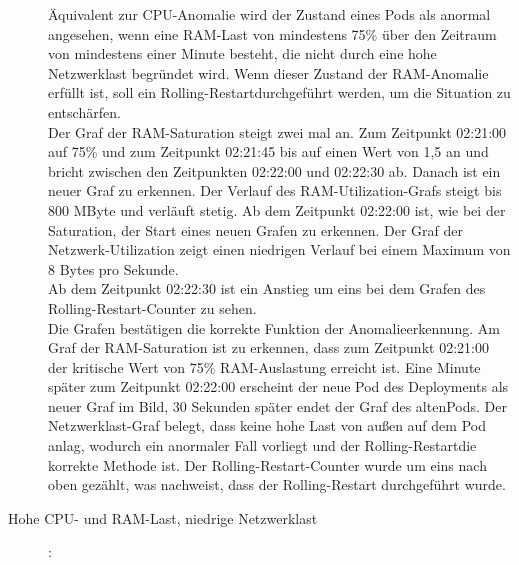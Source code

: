 \documentclass[a4paper,10pt]{scrartcl}
\begin{document}
\begin{description}
Äquivalent zur CPU-Anomalie wird der Zustand eines Pods als anormal angesehen, wenn eine RAM-Last von mindestens 75\% über den Zeitraum von mindestens einer Minute besteht, die nicht durch eine hohe Netzwerklast begründet wird. Wenn dieser Zustand  der RAM-Anomalie erfüllt ist, soll ein \glqq Rolling-Restart\grqq durchgeführt werden, um die Situation zu entschärfen.\\
Der Graf der RAM-Saturation steigt zwei mal an. Zum Zeitpunkt 02:21:00 auf 75\% und zum Zeitpunkt 02:21:45 bis auf einen Wert von 1,5 an und bricht zwischen den Zeitpunkten 02:22:00 und 02:22:30 ab. Danach ist ein neuer Graf zu erkennen.
Der Verlauf des RAM-Utilization-Grafs steigt bis 800 MByte und verläuft stetig. Ab dem Zeitpunkt 02:22:00 ist, wie bei der Saturation, der Start eines neuen Grafen zu erkennen.
Der Graf der Netzwerk-Utilization zeigt einen niedrigen Verlauf bei einem Maximum von 8 Bytes pro Sekunde.\\
Ab dem Zeitpunkt 02:22:30 ist ein Anstieg um eins bei dem Grafen des \glqq Rolling-Restart\grqq -Counter zu sehen.\\
Die Grafen bestätigen die korrekte Funktion der Anomalieerkennung. Am Graf der RAM-Saturation ist zu erkennen, dass zum Zeitpunkt 02:21:00 der kritische Wert von 75\% RAM-Auslastung erreicht ist. Eine Minute später zum Zeitpunkt 02:22:00 erscheint der neue Pod des Deployments als neuer Graf im Bild, 30 Sekunden später endet der Graf des \glqq alten\grqq Pods. Der Netzwerklast-Graf belegt, dass keine hohe Last von außen auf dem Pod anlag, wodurch ein anormaler Fall vorliegt und der \glqq Rolling-Restart\grqq die korrekte Methode ist.
Der \glqq Rolling-Restart\grqq -Counter wurde um eins nach oben gezählt, was nachweist, dass der Rolling-Restart durchgeführt wurde. 
\pagebreak

\item[Hohe CPU- und RAM-Last, niedrige Netzwerklast]:\\


\end{description}
\end{document}
